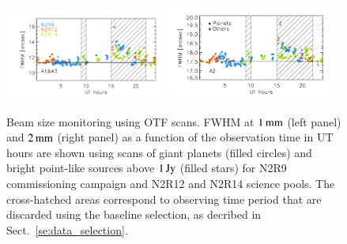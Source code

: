 \begin{figure}[ht!]
  \begin{center}
    \includegraphics[clip=true, trim={0.9cm, 0.5cm, 0.5cm, 0.5cm}, width=0.4725\textwidth]{Figures/Beam_monitoring_with_otfs_vs_ut_1mm.pdf}
    \includegraphics[clip=true, trim={0.5cm, 0.5cm, 0.5cm, 0.5cm}, width=0.4875\textwidth]{Figures/Beam_monitoring_with_otfs_vs_ut_a2.pdf}
    \caption[Beam size monitoring using OTF scans]{Beam size
      monitoring using OTF scans. FWHM at $1\,\rm{mm}$ (left panel)
      and $2\,\rm{mm}$ (right panel) as a function of the
      observation time in UT hours are shown using scans of giant
      planets (filled circles) and bright point-like sources above
      $1\,\rm{Jy}$ (filled stars) for N2R9 commissioning campaign and
      N2R12 and N2R14 science pools. The cross-hatched areas
      correspond to observing time period that are discarded using
      the baseline selection, as decribed in Sect.~\ref{se:data_selection}.} 
\label{fig:beam_monitoring_otf}
  \end{center}
\end{figure}

